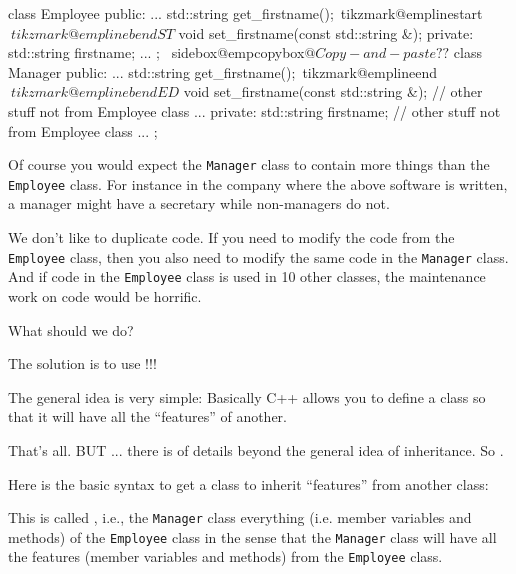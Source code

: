 \begin{console}[commandchars=\~\@\$]
class Employee
{
public:
        ...
        std::string get_firstname();~tikzmark@emplinestart$                ~tikzmark@emplinebendST$
        void set_firstname(const std::string &);
private:
        std::string firstname;
        ...
};
~sidebox@empcopybox$@Copy-and-paste??$
class Manager
{
public:
        ...
        std::string get_firstname();~tikzmark@emplineend$                 ~tikzmark@emplinebendED$
        void set_firstname(const std::string &);
        // other stuff not from Employee class
        ...
private:
        std::string firstname;
        // other stuff not from Employee class
        ...
}; 
\end{console}
Of course you would expect the \texttt{Manager} class to contain more
things than the \texttt{Employee} class. For instance in the company where
the above software is written, a manager might have a secretary while
non-managers do not.

We don't like to duplicate code. If you need to modify the code from the
\texttt{Employee} class, then you also need to modify the same code in the
\texttt{Manager} class. And if code in the \texttt{Employee} class is used
in 10 other classes, the maintenance work on code would be horrific.

What should we do?

\newpage{}

The solution is to use !!!

The general idea is very simple: Basically C++ allows you to define a
class so that it will have all the ``features'' of another.

That's all. BUT ... there is  of details beyond the
general idea of inheritance. So .

Here is the basic syntax to get a class to inherit ``features'' from
another class:

This is called , i.e., the \texttt{Manager}
class  everything (i.e. member variables and methods)
of the \texttt{Employee} class in the sense that the \texttt{Manager} class
will have all the features (member variables and methods) from the
\texttt{Employee} class.

